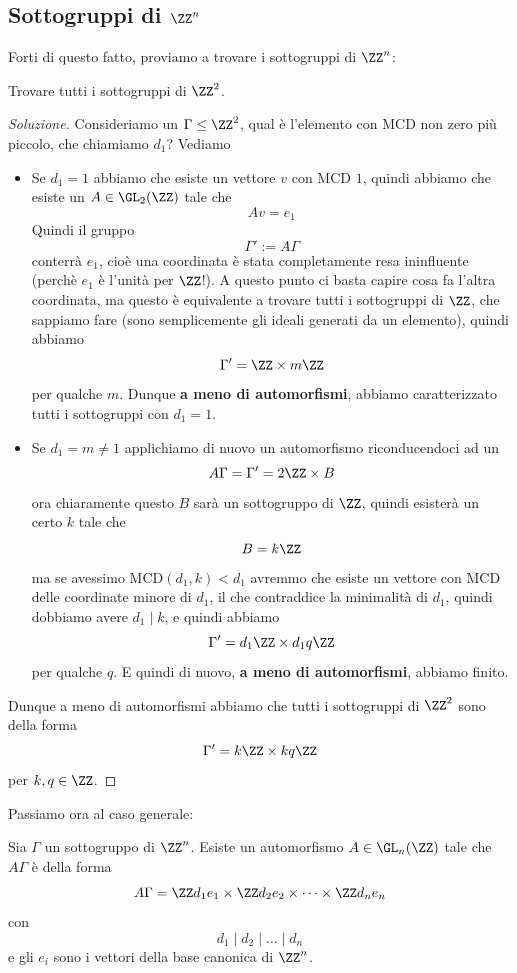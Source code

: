 \documentclass[11pt]{scrartcl}
\begin{document}
	\subsection{Sottogruppi di $\ZZ^n$}
	Forti di questo fatto, proviamo a trovare i sottogruppi di $\ZZ^n$:
	\begin{example}
		Trovare tutti i sottogruppi di $\ZZ^2$.
	\end{example}
	\begin{proof}[Soluzione]
		Consideriamo un $\Gamma\le \ZZ^2$, qual è l'elemento con MCD non zero più piccolo, che chiamiamo $d_1$? Vediamo
		\begin{itemize}
			\item Se $d_1=1$ abbiamo che esiste un vettore $v$ con MCD $1$, quindi abbiamo che esiste un $A\in \GL_2(\ZZ)$ tale che 
			$$Av=e_1$$
			Quindi il gruppo 
			$$\Gamma':=A\Gamma$$
			conterrà $e_1$, cioè una coordinata è stata completamente resa ininfluente (perchè $e_1$ è l'unità per $\ZZ$!). A questo punto ci basta capire cosa fa l'altra coordinata, ma questo è equivalente a trovare tutti i sottogruppi di $\ZZ$, che sappiamo fare (sono semplicemente gli ideali generati da un elemento), quindi abbiamo
			$$\Gamma'=\ZZ\times m\ZZ$$
			per qualche $m$. Dunque \textbf{a meno di automorfismi}, abbiamo caratterizzato tutti i sottogruppi con $d_1=1$.
			\item Se $d_1=m\ne 1$ applichiamo di nuovo un automorfismo riconducendoci ad un $$A\Gamma=\Gamma'=2\ZZ\times B$$
			ora chiaramente questo $B$ sarà un sottogruppo di $\ZZ$, quindi esisterà un certo $k$ tale che
			$$B=k\ZZ$$
			ma se avessimo $\text{MCD}(d_1,k)< d_1$ avremmo che esiste un vettore con MCD delle coordinate minore di $d_1$, il che contraddice la minimalità di $d_1$, quindi dobbiamo avere $d_1\mid k$, e quindi abbiamo
			$$\Gamma'=d_1\ZZ\times d_1q\ZZ$$
			per qualche $q$. E quindi di nuovo, \textbf{a meno di automorfismi}, abbiamo finito.
		\end{itemize}
		Dunque a meno di automorfismi abbiamo che tutti i sottogruppi di $\ZZ^2$ sono della forma
		$$\Gamma'=k\ZZ\times kq\ZZ$$
		per $k,q\in\ZZ$.
	\end{proof}
	Passiamo ora al caso generale:
	\begin{proposition}[Sottogruppi di $\ZZ^n$]
		Sia $\Gamma$ un sottogruppo di $\ZZ^n$. Esiste un automorfismo $A\in\GL_n(\ZZ)$ tale che $A\Gamma$ è della forma
		$$A\Gamma=\ZZ d_1e_1\times \ZZ d_2 e_2\times \dots \times \ZZ d_ne_n$$
		con 
		$$d_1\mid d_2 \mid \dots \mid d_n$$
		e gli $e_i$ sono i vettori della base canonica di $\ZZ^n$.
	\end{proposition}
\end{document}
